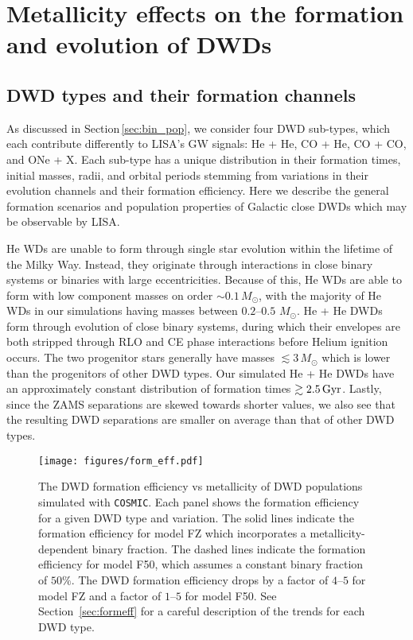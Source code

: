\documentclass[twocolumn, linenumbers]{aastex631}
\newcommand{\cosmic}{\texttt{COSMIC}}
\begin{document}
\section{Metallicity effects on the formation and evolution of DWDs}\label{sec:results}

\subsection{DWD types and their formation channels}\label{sec:ini}
As discussed in Section\,\ref{sec:bin_pop}, we consider four DWD sub-types, which each contribute differently to LISA's GW signals: He + He, CO + He, CO + CO, and ONe + X. Each sub-type has a unique distribution in their formation times, initial masses, radii, and orbital periods stemming from variations in their evolution channels and their formation efficiency. Here we describe the general formation scenarios and population properties of Galactic close DWDs which may be observable by LISA.

He WDs are unable to form through single star evolution within the lifetime of the Milky Way. Instead, they originate through interactions in close binary systems or binaries with large eccentricities. Because of this, He WDs are able to form with low component masses on order $\sim 0.1\,M_\odot$, with the majority of He WDs in our simulations having masses between $0.2$--$0.5$ $M_\odot$. He + He DWDs form through evolution of close binary systems, during which their envelopes are both stripped through RLO and CE phase interactions before Helium ignition occurs. The two progenitor stars generally have masses $\lesssim 3\,M_\odot$ which is lower than the progenitors of other DWD types. Our simulated He + He DWDs have an approximately constant distribution of formation times $\gtrsim 2.5\,\rm{Gyr}$. Lastly, since the ZAMS separations are skewed towards shorter values, we also see that the resulting DWD separations are smaller on average than that of other DWD types. 

\begin{figure*}
	\texttt{[image: figures/form\_eff.pdf]}
    \caption{The DWD formation efficiency vs metallicity of DWD populations simulated with \cosmic. Each panel shows the formation efficiency for a given DWD type and variation. The solid lines indicate the formation efficiency for model FZ which incorporates a metallicity-dependent binary fraction. The dashed lines indicate the formation efficiency for model F50, which assumes a constant binary fraction of $50\%$. The DWD formation efficiency drops by a factor of $4$--$5$ for model FZ and a factor of $1$--$5$ for model F50. See Section~\ref{sec:formeff} for a careful description of the trends for each DWD type.}
    \label{fig:form_eff}
\end{figure*}
\end{document}
